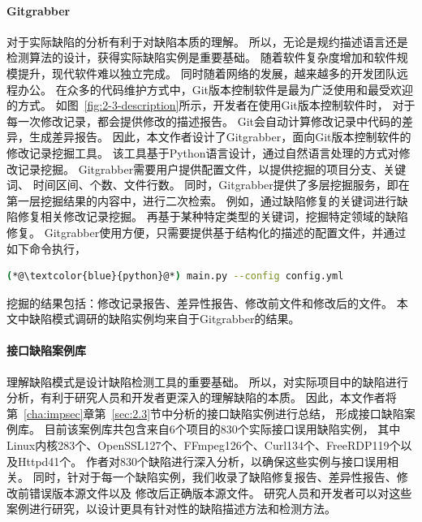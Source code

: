 \paragraph{Gitgrabber}
对于实际缺陷的分析有利于对缺陷本质的理解。
所以，无论是规约描述语言还是检测算法的设计，获得实际缺陷实例是重要基础。
随着软件复杂度增加和软件规模提升，现代软件难以独立完成。
同时随着网络的发展，越来越多的开发团队远程办公。
在众多的代码维护方式中，Git版本控制软件是最为广泛使用和最受欢迎的方式。
如图~\ref{fig:2-3-description}所示，开发者在使用Git版本控制软件时，
对于每一次修改记录，都会提供修改的描述报告。
Git会自动计算修改记录中代码的差异，生成差异报告。
因此，本文作者设计了Gitgrabber，面向Git版本控制软件的修改记录挖掘工具。
该工具基于Python语言设计，通过自然语言处理的方式对修改记录挖掘。
Gitgrabber需要用户提供配置文件，以提供挖掘的项目分支、关键词、
时间区间、个数、文件行数。
同时，Gitgrabber提供了多层挖掘服务，即在第一层挖掘结果的内容中，进行二次检索。
例如，通过缺陷修复的关键词进行缺陷修复相关修改记录挖掘。
再基于某种特定类型的关键词，挖掘特定领域的缺陷修复。
Gitgrabber使用方便，只需要提供基于结构化的描述的配置文件，并通过如下命令执行，
\begin{lstlisting}[language={bash},
basicstyle=\linespread{0.8}\listingsfont,
numbers=none,
xleftmargin=.3\textwidth]
(*@\textcolor{blue}{python}@*) main.py --config config.yml
\end{lstlisting}
挖掘的结果包括：修改记录报告、差异性报告、修改前文件和修改后的文件。
本文中缺陷模式调研的缺陷实例均来自于Gitgrabber的结果。

\paragraph{接口缺陷案例库}
理解缺陷模式是设计缺陷检测工具的重要基础。
所以，对实际项目中的缺陷进行分析，有利于研究人员和开发者更深入的理解缺陷的本质。
因此，本文作者将第~\ref{cha:impsec}章第~\ref{sec:2.3}节中分析的接口缺陷实例进行总结，
形成接口缺陷案例库。
目前该案例库共包含来自6个项目的830个实际接口误用缺陷实例，
其中Linux内核283个、OpenSSL127个、FFmpeg126个、Curl134个、FreeRDP119个以及Httpd41个。
作者对830个缺陷进行深入分析，以确保这些实例与接口误用相关。
同时，针对于每一个缺陷实例，我们收录了缺陷修复报告、差异性报告、修改前错误版本源文件以及
修改后正确版本源文件。
研究人员和开发者可以对这些案例进行研究，以设计更具有针对性的缺陷描述方法和检测方法。

